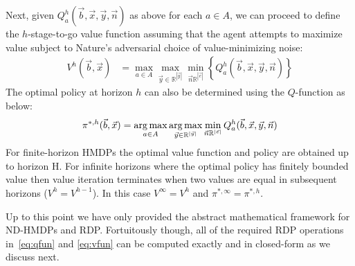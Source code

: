 Next, given $Q_a^h(\vec{b},\vec{x},\vec{y},\vec{n})$ as above for each
$a \in A$, we can proceed to define the $h$-stage-to-go value function
assuming that the agent attempts to maximize value subject to Nature's
adversarial choice of value-minimizing noise:
\vspace{-2mm}
{\footnotesize
\begin{align}
V^{h}(\vec{b},\vec{x}) & = \max_{a \in A} \max_{\vec{y} \in \mathbb{R}^{|\vec{y}|}} \min_{\vec{n} \mathbb{R}^{|\vec{e}|}} \left\{ Q^{h}_a(\vec{b},\vec{x},\vec{y},\vec{n}) \right\} \label{eq:vfun}
\end{align}}
The optimal policy at horizon $h$ can also be determined using the
$Q$-function as below:
{\footnotesize
\begin{align}
\pi^{*,h}(\vec{b},\vec{x}) = \argmax_{a \in A}  \argmax_{\vec{y} \in \mathbb{R}^{|\vec{y}|}}  \min_{\vec{n} \mathbb{R}^{|\vec{e}|}}  Q^h_a(\vec{b},\vec{x},\vec{y},\vec{n})
\end{align}}
For finite-horizon HMDPs the optimal value function and policy are
obtained up to horizon H.  For infinite horizons where the optimal policy
has finitely bounded value then value iteration terminates when two
values are equal in subsequent horizons ($V^{h} = V^{h-1}$). In this
case $V^\infty = V^h$ and $\pi^{*,\infty} = \pi^{*,h}$.
 
Up to this point we have only provided the abstract mathematical
framework for ND-HMDPs and RDP.  Fortuitously though, all of the
required RDP operations in~\eqref{eq:qfun} and \eqref{eq:vfun} can be
computed exactly and in closed-form as we discuss next.
